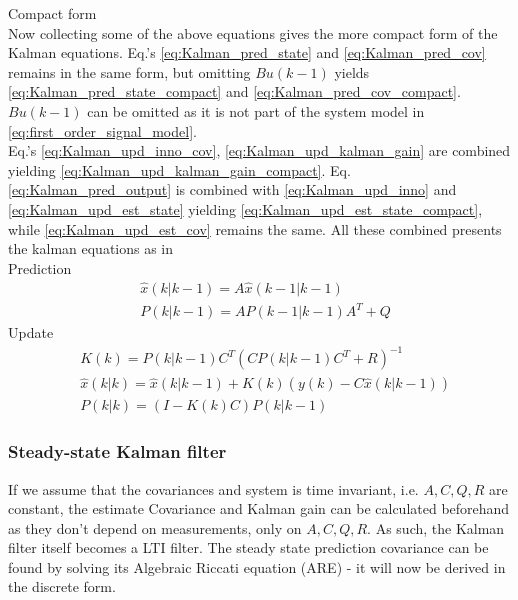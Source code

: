 {Compact form}\\
Now collecting some of the above equations gives the more compact form of the Kalman equations.
Eq.'s \ref{eq:Kalman_pred_state} and \ref{eq:Kalman_pred_cov} remains in the same form, but omitting $ {Bu}(k-1) $ yields \cref{eq:Kalman_pred_state_compact} and \cref{eq:Kalman_pred_cov_compact}. $ {Bu}(k-1) $ can be omitted as it is not part of the system model in \cref{eq:first_order_signal_model}.\\
Eq.'s \ref{eq:Kalman_upd_inno_cov}, \ref{eq:Kalman_upd_kalman_gain} are combined yielding \cref{eq:Kalman_upd_kalman_gain_compact}. Eq. \ref{eq:Kalman_pred_output} is combined with \cref{eq:Kalman_upd_inno} and \cref{eq:Kalman_upd_est_state} yielding \cref{eq:Kalman_upd_est_state_compact}, while \cref{eq:Kalman_upd_est_cov} remains the same. All these combined presents the kalman equations as in \cite{Bozic1994}\\

{Prediction}
\begin{align}
	&\hat{{x}}	(k|k-1) = {A} \hat{{x}}	(k-1|k-1) 		\label{eq:Kalman_pred_state_compact} 	\\
	&{P}			(k|k-1) = {A}{P}			(k-1|k-1){A}^T+{Q} 				\label{eq:Kalman_pred_cov_compact} 		
\end{align}
{Update}
\begin{align}
	&{K}			(k) 		= {P}				(k|k-1){C}^T({C}{P}	(k|k-1)	{C}^T + {R})^{-1}										\label{eq:Kalman_upd_kalman_gain_compact} \\
	&\hat{{x}}	(k|k) 	= \hat{{x}}			(k|k-1) + {K}						(k)	({y}		(k) - {C}\hat{{x}}		(k|k-1)) 	\label{eq:Kalman_upd_est_state_compact} \\
	&{P}			(k|k) 	= ({I} - {K}	(k){C}){P}					(k|k-1)																		\label{eq:Kalman_upd_est_cov_compact}
\end{align}


\subsubsection{Steady-state Kalman filter}
If we assume that the covariances and system is time invariant, i.e. $ {A}, {C}, {Q}, {R} $ are constant, the estimate Covariance and Kalman gain can be calculated beforehand as they don't depend on measurements, only on $ {A}, {C}, {Q}, {R} $. As such, the Kalman filter itself becomes a LTI filter. The steady state prediction covariance can be found by solving its Algebraic Riccati equation (ARE) - it will now be derived in the discrete form.\\


